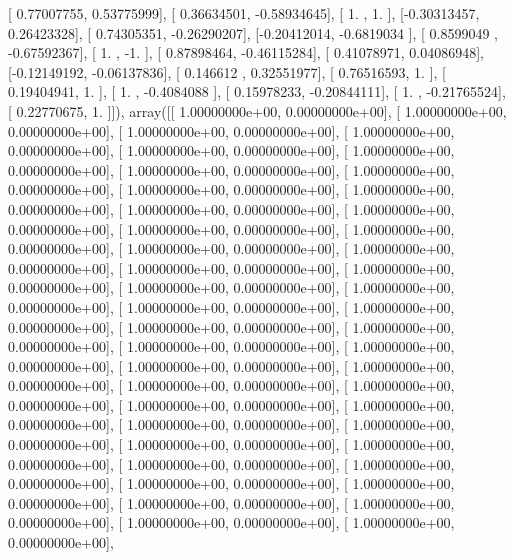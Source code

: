 \documentclass{article}
\begin{document}
       [ 0.77007755,  0.53775999],
       [ 0.36634501, -0.58934645],
       [ 1.        ,  1.        ],
       [-0.30313457,  0.26423328],
       [ 0.74305351, -0.26290207],
       [-0.20412014, -0.6819034 ],
       [ 0.8599049 , -0.67592367],
       [ 1.        , -1.        ],
       [ 0.87898464, -0.46115284],
       [ 0.41078971,  0.04086948],
       [-0.12149192, -0.06137836],
       [ 0.146612  ,  0.32551977],
       [ 0.76516593,  1.        ],
       [ 0.19404941,  1.        ],
       [ 1.        , -0.4084088 ],
       [ 0.15978233, -0.20844111],
       [ 1.        , -0.21765524],
       [ 0.22770675,  1.        ]]), array([[  1.00000000e+00,   0.00000000e+00],
       [  1.00000000e+00,   0.00000000e+00],
       [  1.00000000e+00,   0.00000000e+00],
       [  1.00000000e+00,   0.00000000e+00],
       [  1.00000000e+00,   0.00000000e+00],
       [  1.00000000e+00,   0.00000000e+00],
       [  1.00000000e+00,   0.00000000e+00],
       [  1.00000000e+00,   0.00000000e+00],
       [  1.00000000e+00,   0.00000000e+00],
       [  1.00000000e+00,   0.00000000e+00],
       [  1.00000000e+00,   0.00000000e+00],
       [  1.00000000e+00,   0.00000000e+00],
       [  1.00000000e+00,   0.00000000e+00],
       [  1.00000000e+00,   0.00000000e+00],
       [  1.00000000e+00,   0.00000000e+00],
       [  1.00000000e+00,   0.00000000e+00],
       [  1.00000000e+00,   0.00000000e+00],
       [  1.00000000e+00,   0.00000000e+00],
       [  1.00000000e+00,   0.00000000e+00],
       [  1.00000000e+00,   0.00000000e+00],
       [  1.00000000e+00,   0.00000000e+00],
       [  1.00000000e+00,   0.00000000e+00],
       [  1.00000000e+00,   0.00000000e+00],
       [  1.00000000e+00,   0.00000000e+00],
       [  1.00000000e+00,   0.00000000e+00],
       [  1.00000000e+00,   0.00000000e+00],
       [  1.00000000e+00,   0.00000000e+00],
       [  1.00000000e+00,   0.00000000e+00],
       [  1.00000000e+00,   0.00000000e+00],
       [  1.00000000e+00,   0.00000000e+00],
       [  1.00000000e+00,   0.00000000e+00],
       [  1.00000000e+00,   0.00000000e+00],
       [  1.00000000e+00,   0.00000000e+00],
       [  1.00000000e+00,   0.00000000e+00],
       [  1.00000000e+00,   0.00000000e+00],
       [  1.00000000e+00,   0.00000000e+00],
       [  1.00000000e+00,   0.00000000e+00],
       [  1.00000000e+00,   0.00000000e+00],
       [  1.00000000e+00,   0.00000000e+00],
       [  1.00000000e+00,   0.00000000e+00],
       [  1.00000000e+00,   0.00000000e+00],
       [  1.00000000e+00,   0.00000000e+00],
       [  1.00000000e+00,   0.00000000e+00],
       [  1.00000000e+00,   0.00000000e+00],
\end{document}
